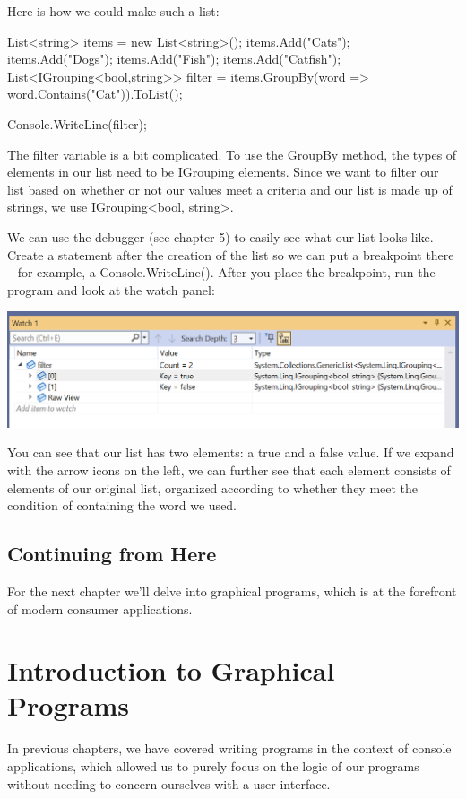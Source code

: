 \documentclass[oneside, openany] {book}
\begin{document}
Here is how we could make such a list:

\begin{CSharp}
List<string> items = new List<string>();
items.Add("Cats");
items.Add("Dogs");
items.Add("Fish");
items.Add("Catfish");
List<IGrouping<bool,string>> filter =
items.GroupBy(word => word.Contains("Cat")).ToList();

Console.WriteLine(filter);
\end{CSharp}
The filter variable is a bit complicated. To use the GroupBy method, the types of elements in our list need to be IGrouping elements. Since we want to filter our list based on whether or not our values meet a criteria and our list is made up of strings, we use IGrouping<bool, string>.

We can use the debugger (see chapter 5) to easily see what our list looks like. Create a statement after the creation of the list so we can put a breakpoint there -- for example, a Console.WriteLine(). After you place the breakpoint, run the program and look at the watch panel:

\includegraphics[scale=0.33]{groupbydebugger1}

You can see that our list has two elements: a true and a false value. If we expand with the arrow icons on the left, we can further see that each element consists of elements of our original list, organized according to whether they meet the condition of containing the word we used.
\section*{Continuing from Here}
For the next chapter we'll delve into graphical programs, which is at the forefront of modern consumer applications.
\chapter{Introduction to Graphical Programs}
\minitoc
{}
In previous chapters, we have covered writing programs in the context of console applications, which allowed us to purely focus on the logic of our programs without needing to concern ourselves with a user interface.
\end{document}
